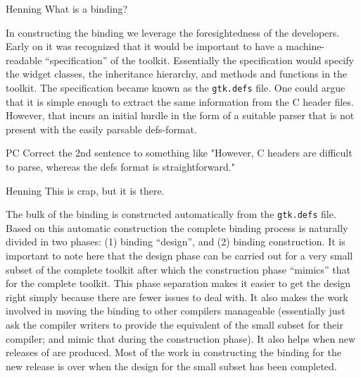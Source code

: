 \documentclass[workingdraft]{usetex-v1}
\begin{document}
\begin{ednote}{Henning}
  What is a binding?
\end{ednote}

In constructing the \mgtk binding we leverage the foresightedness of
the \gtk developers. Early on it was recognized that it would be
important to have a machine-readable ``specification'' of the toolkit.
Essentially the specification would specify the widget classes, the
inheritance hierarchy, and methods and functions in the toolkit. The
specification became known as the \texttt{gtk.defs} file. One could
argue that it is simple enough to extract the same information from
the C header files. However, that incurs an initial hurdle in the
form of a suitable parser that is not present with the easily parsable
defs-format.
\begin{ednote}{PC}
  Correct the 2nd sentence to something like "However, C headers are
  difficult to parse, whereas the defs format is straightforward."
\end{ednote}


\begin{ednote}{Henning} This is crap, but it is there. \end{ednote}

The bulk of the \mgtk binding is constructed automatically from the
\texttt{gtk.defs} file. Based on this automatic construction the
complete binding process is naturally divided in two phases: (1)
binding ``design'', and (2) binding construction. It is important to
note here that the design phase can be carried out for a very small
subset of the complete toolkit after which the construction phase
``mimics'' that for the complete toolkit.
This phase separation makes it easier to get the design right simply
because there are fewer issues to deal with.  It also makes the work
involved in moving the binding to other \sml compilers manageable
(essentially just ask the compiler writers to provide the equivalent
of the small subset for their compiler; and mimic that during the
construction phase). It also helps when new releases of \gtk are
produced. Most of the work in constructing the binding for the new
release is over when the design for the small subset has been completed.
\end{document}
